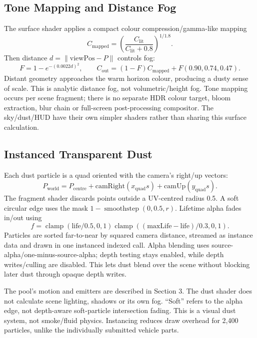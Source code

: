 \subsection{Tone Mapping and Distance Fog}
The surface shader applies a compact colour compression/gamma-like mapping
\begin{equation}
C_{\mathrm{mapped}}=\left(\frac{C_{\mathrm{lit}}}{C_{\mathrm{lit}}+0.8}\right)^{1/1.8}.
\end{equation}
Then distance $d=\|\mathrm{viewPos}-P\|$ controls fog:
\begin{equation}
F=1-e^{-(0.0022d)^2},\qquad C_{\mathrm{out}}=(1-F)C_{\mathrm{mapped}}+F(0.90,0.74,0.47).
\end{equation}
Distant geometry approaches the warm horizon colour, producing a dusty sense of scale. This is analytic distance fog, not volumetric/height fog. Tone mapping occurs per scene fragment; there is no separate HDR colour target, bloom extraction, blur chain or full-screen post-processing compositor. The sky/dust/HUD have their own simpler shaders rather than sharing this surface calculation.

\subsection{Instanced Transparent Dust}
Each dust particle is a quad oriented with the camera's right/up vectors:
\begin{equation}
P_{\mathrm{world}}=P_{\mathrm{centre}}+\mathrm{camRight}(x_{\mathrm{quad}}s)+\mathrm{camUp}(y_{\mathrm{quad}}s).
\end{equation}
The fragment shader discards points outside a UV-centred radius 0.5. A soft circular edge uses the mask $1-\operatorname{smoothstep}(0,0.5,r)$. Lifetime alpha fades in/out using
\begin{equation}
f=\operatorname{clamp}(\mathrm{life}/0.5,0,1)
\operatorname{clamp}((\mathrm{maxLife}-\mathrm{life})/0.3,0,1).
\end{equation}
Particles are sorted far-to-near by squared camera distance, streamed as instance data and drawn in one instanced indexed call. Alpha blending uses source-alpha/one-minus-source-alpha; depth testing stays enabled, while depth writes/culling are disabled. This lets dust blend over the scene without blocking later dust through opaque depth writes.

The pool's motion and emitters are described in Section 3. The dust shader does not calculate scene lighting, shadows or its own fog. ``Soft'' refers to the alpha edge, not depth-aware soft-particle intersection fading. This is a visual dust system, not smoke/fluid physics. Instancing reduces draw overhead for 2,400 particles, unlike the individually submitted vehicle parts.

